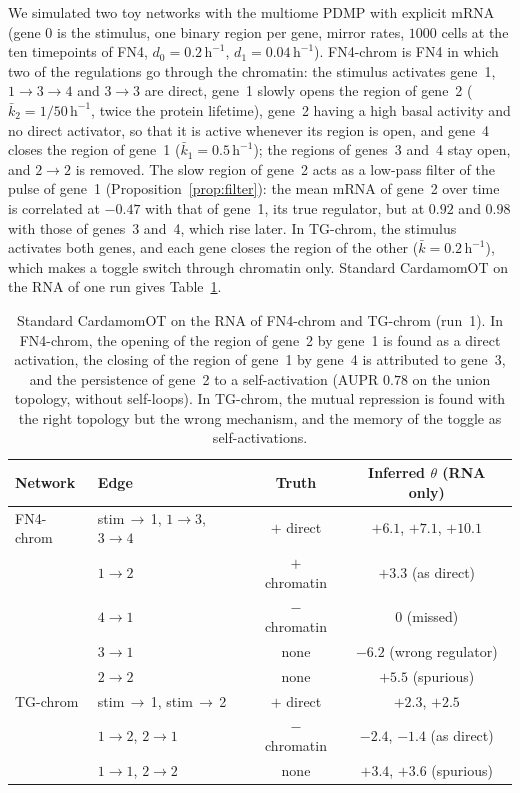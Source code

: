 \documentclass[a4paper, 11pt]{article}
\theoremstyle{plain}
\theoremstyle{remark}
\begin{document}
We simulated two toy networks with the multiome PDMP with explicit mRNA (gene $0$ is the stimulus, one binary region per gene, mirror rates, $1000$ cells at the ten timepoints of FN4, $d_0 = 0.2\,\mathrm{h}^{-1}$, $d_1 = 0.04\,\mathrm{h}^{-1}$). FN4-chrom is FN4 in which two of the regulations go through the chromatin: the stimulus activates gene~1, $1 \to 3 \to 4$ and $3 \to 3$ are direct, gene~1 slowly opens the region of gene~2 ($\bar k_2 = 1/50\,\mathrm{h}^{-1}$, twice the protein lifetime), gene~2 having a high basal activity and no direct activator, so that it is active whenever its region is open, and gene~4 closes the region of gene~1 ($\bar k_1 = 0.5\,\mathrm{h}^{-1}$); the regions of genes~3 and~4 stay open, and $2 \to 2$ is removed. The slow region of gene~2 acts as a low-pass filter of the pulse of gene~1 (Proposition~\ref{prop:filter}): the mean mRNA of gene~2 over time is correlated at $-0.47$ with that of gene~1, its true regulator, but at $0.92$ and $0.98$ with those of genes~3 and~4, which rise later. In TG-chrom, the stimulus activates both genes, and each gene closes the region of the other ($\bar k = 0.2\,\mathrm{h}^{-1}$), which makes a toggle switch through chromatin only. Standard CardamomOT on the RNA of one run gives Table~\ref{tab:standard}.

\begin{table}[!ht]
\centering
\small
\begin{tabular}{llcc}
\toprule
Network & Edge & Truth & Inferred $\theta$ (RNA only) \\
\midrule
FN4-chrom & stim\,$\to$\,1, $1\to 3$, $3\to 4$ & $+$ direct & $+6.1$, $+7.1$, $+10.1$ \\
 & $1\to 2$ & $+$ chromatin & $+3.3$ (as direct) \\
 & $4\to 1$ & $-$ chromatin & $0$ (missed) \\
 & $3\to 1$ & none & $-6.2$ (wrong regulator) \\
 & $2\to 2$ & none & $+5.5$ (spurious) \\
\midrule
TG-chrom & stim\,$\to$\,1, stim\,$\to$\,2 & $+$ direct & $+2.3$, $+2.5$ \\
 & $1\to 2$, $2\to 1$ & $-$ chromatin & $-2.4$, $-1.4$ (as direct) \\
 & $1\to 1$, $2\to 2$ & none & $+3.4$, $+3.6$ (spurious) \\
\bottomrule
\end{tabular}
\caption{Standard CardamomOT on the RNA of FN4-chrom and TG-chrom (run~1). In FN4-chrom, the opening of the region of gene~2 by gene~1 is found as a direct activation, the closing of the region of gene~1 by gene~4 is attributed to gene~3, and the persistence of gene~2 to a self-activation (AUPR $0.78$ on the union topology, without self-loops). In TG-chrom, the mutual repression is found with the right topology but the wrong mechanism, and the memory of the toggle as self-activations.}
\label{tab:standard}
\end{table}
\end{document}
